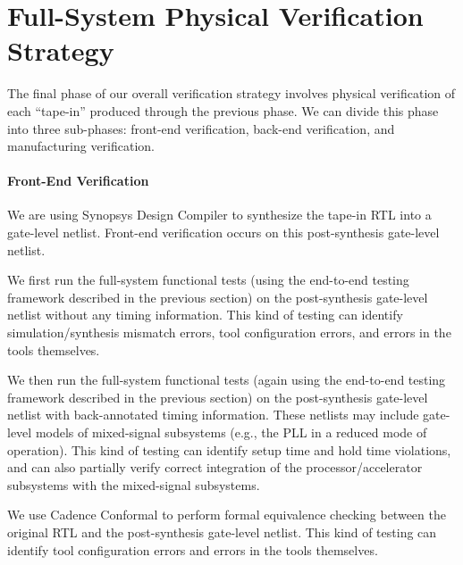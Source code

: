 
\section{Full-System Physical Verification Strategy}
\label{sec-full-sys-physical}

The final phase of our overall verification strategy involves physical
verification of each ``tape-in'' produced through the previous phase. We
can divide this phase into three sub-phases: front-end verification,
back-end verification, and manufacturing verification.

\smallskip
\paragraph{Front-End Verification}
We are using Synopsys Design Compiler to synthesize the tape-in RTL into
a gate-level netlist. Front-end verification occurs on this
post-synthesis gate-level netlist.

\smallskip
\begin{cbxlist}{1.5em}{0em}{0.5em}

  \item {} We first run the
     full-system functional tests (using the end-to-end testing framework
     described in the previous section) on the post-synthesis gate-level
     netlist without any timing information. This kind of testing can
     identify simulation/synthesis mismatch errors, tool configuration
     errors, and errors in the tools themselves.

  \item {} We then run the
     full-system functional tests (again using the end-to-end testing
     framework described in the previous section) on the post-synthesis
     gate-level netlist with back-annotated timing information. These
     netlists may include gate-level models of mixed-signal subsystems
     (e.g., the PLL in a reduced mode of operation). This kind of testing
     can identify setup time and hold time violations, and can also
     partially verify correct integration of the processor/accelerator
     subsystems with the mixed-signal subsystems.

  \item {} We use Cadence Conformal to
     perform formal equivalence checking between the original RTL and the
     post-synthesis gate-level netlist. This kind of testing can identify
     tool configuration errors and errors in the tools themselves.

\end{cbxlist}

